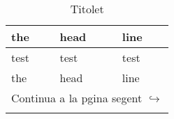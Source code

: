
\renewcommand{\tablename}{Taula}
\begin{longtable}{|X|X|X|}
\caption{Titolet}   %
\label{fran}\\      %

\hline the & head& line\\ \hline \endfirsthead
\hline test & test & test \\
\hline the & head& line\\ \hline \endhead

\hline \multicolumn{3}{|r|}{\scriptsize{Continua a la pgina segent $\hookrightarrow$}}\\ \hline \endfoot
\hline \endlastfoot


\end{longtable}
